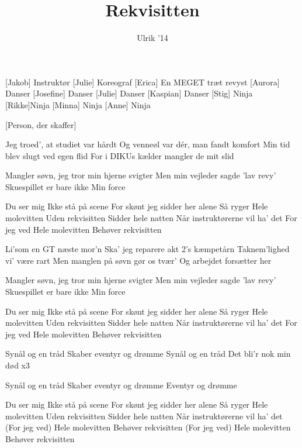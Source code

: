 \documentclass[a4paper,11pt]{article}
\title{Rekvisitten}
\author{Ulrik '14}
\begin{document}
\maketitle

\begin{roles}
[Jakob] Instruktør
[Julie] Koreograf
[Erica] En MEGET træt revyst
[Aurora] Danser
[Josefine] Danser
[Julie] Danser
[Kaspian] Danser
[Stig] Ninja
[Rikke]Ninja 
[Minna] Ninja
[Anne] Ninja
\end{roles}

\begin{props}
[Person, der skaffer]
\end{props}


\begin{song}
 Jeg troed', at studiet var hårdt
Og venneøl var dér, man fandt komfort
Min tid blev slugt ved egen flid
For i DIKUs kælder mangler de mit slid

 Mangler søvn, jeg tror min hjerne svigter
Men min vejleder sagde 'lav revy'
Skuespillet er bare ikke
Min force

 Du ser mig
Ikke stå på scene
For skønt jeg sidder her alene
Så ryger
Hele molevitten
Uden rekvisitten
Sidder hele natten
Når instruktørerne vil ha' det
For jeg ved
Hele molevitten
Behøver rekvisitten

 Li'som en GT næste mor'n
Ska' jeg reparere akt 2's kæmpetårn
Taknem’lighed vi' være rart
Men manglen på søvn gør os tvær'
Og arbejdet forsætter her

 Mangler søvn, jeg tror min hjerne svigter
Men min vejleder sagde 'lav revy'
Skuespillet er bare ikke
Min force

 Du ser mig
Ikke stå på scene
For skønt jeg sidder her alene
Så ryger
Hele molevitten
Uden rekvisitten
Sidder hele natten
Når instruktørerne vil ha' det
For jeg ved
Hele molevitten
Behøver rekvisitten

 Synål og en tråd
Skaber eventyr og drømme 
Synål og en tråd
Det bli'r nok min død
x3

 Synål og en tråd
Skaber eventyr og drømme
Eventyr og drømme


 Du ser mig
Ikke stå på scene
For skønt jeg sidder her alene
Så ryger
Hele molevitten
Uden rekvisitten
Sidder hele natten
Når instruktørerne vil ha' det
(For jeg ved)
Hele molevitten
Behøver rekvisitten
(For jeg ved)
Hele molevitten
Behøver rekvisitten

\end{song}
\end{document}
